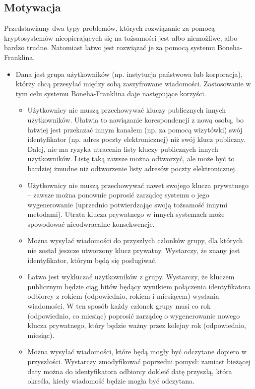 \subsection*{Motywacja}

\noindent
Przedstawiamy dwa typy problemów,
których rozwiązanie za pomocą kryptosystemów
nieopierających się na tożsamości
jest albo niemożliwe,
albo bardzo trudne.
Natomiast łatwo jest rozwiązać je za pomocą systemu Boneha-Franklina.

\begin{itemize}
\item
Dana jest grupa użytkowników (np. instytucja państwowa lub korporacja),
którzy chcą przesyłać między sobą zaszyfrowane wiadomości.
Zastosowanie w tym celu systemu Boneha-Franklina daje następujące korzyści.

\begin{itemize}
\item
Użytkownicy nie muszą przechowywać kluczy publicznych innych użytkowników.
Ułatwia to nawiązanie korespondencji z nową osobą,
bo łatwiej jest przekazać innym kanałem (np. za pomocą wizytówki)
swój identyfikator (np. adres poczty elektronicznej)
niż swój klucz publiczny.
Dalej, nie ma ryzyka utracenia listy kluczy publicznych innych użytkowników.
Listę taką zawsze można odtworzyć, ale może być to bardziej żmudne
niż odtworzenie listy adresów poczty elektronicznej.

\item
Użytkownicy nie muszą przechowywać nawet swojego klucza prywatnego --
zawsze można ponownie poprosić zarządcę systemu o jego wygenerowanie
(uprzednio potwierdzając swoją tożsamość innymi metodami).
Utrata klucza prywatnego w innych systemach może spowodować
nieodwracalne konsekwencje.

\item
Można wysyłać wiadomości do przyszłych członków grupy,
dla których nie został jeszcze utworzony klucz prywatny.
Wystarczy, że znany jest identyfikator, którym będą się posługiwać.

\item
Łatwo jest wykluczać użytkowników z grupy.
Wystarczy, że kluczem publicznym będzie ciąg bitów będący wynikiem
połączenia identyfikatora odbiorcy z rokiem (odpowiednio, rokiem i miesiącem)
wysłania wiadomości.
W ten sposób każdy członek grupy musi co rok (odpowiednio, co miesiąc)
poprosić zarządcę o wygenerowanie nowego klucza prywatnego,
który będzie ważny przez kolejny rok (odpowiednio, miesiąc).

\item
Można wysyłać wiadomości, które będą mogły być odczytane dopiero w przyszłości.
Wystarczy zmodyfikować poprzedni pomysł:
zamiast bieżącej daty można do identyfikatora odbiorcy
dokleić datę przyszłą, która określa,
kiedy wiadomość będzie mogła być odczytana.


\end{itemize}
\end{itemize}
